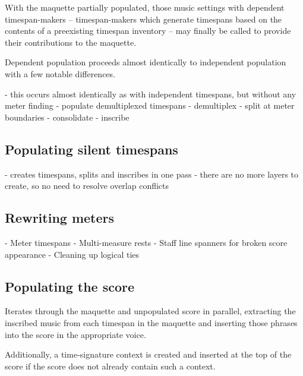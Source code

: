 With the maquette partially populated, those music settings with dependent
timespan-makers -- timespan-makers which generate timespans based on the
contents of a preexisting timespan inventory -- may finally be called to
provide their contributions to the maquette.

Dependent population proceeds almost identically to independent population with
a few notable differences.

\begin{markdown}
-   this occurs almost identically as with independent timespans,
    but without any meter finding
-   populate demultiplexed timespans
-   demultiplex
-   split at meter boundaries
-   consolidate
-   inscribe
\end{markdown}

\subsection{Populating silent timespans}
\label{ssec:populating-silent-timespans}

\begin{markdown}
-   creates timespans, splits and inscribes in one pass
-   there are no more layers to create, so no need to resolve overlap
    conflicts
\end{markdown}

\subsection{Rewriting meters}
\label{ssec:rewriting-meters}

\begin{markdown}
-   Meter timespans
-   Multi-measure rests
-   Staff line spanners for broken score appearance
-   Cleaning up logical ties
\end{markdown}

\subsection{Populating the score}
\label{ssec:populating-the-score}

Iterates through the maquette and unpopulated score in parallel, extracting the
inscribed music from each timespan in the maquette and inserting those phrases
into the score in the appropriate voice.

Additionally, a time-signature context is created and inserted at the top
of the score if the score does not already contain such a context.

